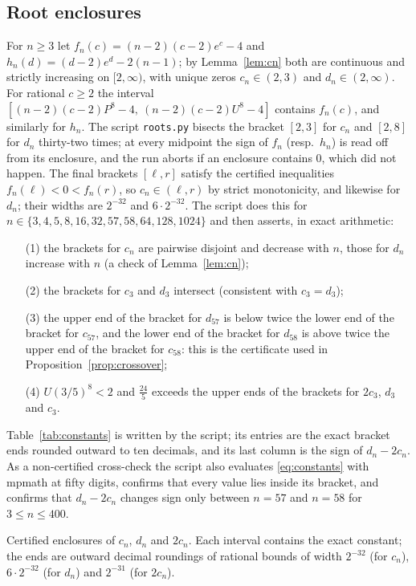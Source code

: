 \documentclass[11pt,a4paper]{article}
\theoremstyle{plain}
\theoremstyle{definition}
\begin{document}
\subsection{Root enclosures}
For $n\ge 3$ let $f_n(c)=(n-2)(c-2)e^{c}-4$ and $h_n(d)=(d-2)e^{d}-2(n-1)$; by Lemma~\ref{lem:cn} both are continuous and strictly increasing on $[2,\infty)$, with unique zeros $c_n\in(2,3)$ and $d_n\in(2,\infty)$. For rational $c\ge 2$ the interval $[(n-2)(c-2)P^8-4,\ (n-2)(c-2)U^8-4]$ contains $f_n(c)$, and similarly for $h_n$. The script \texttt{roots.py} bisects the bracket $[2,3]$ for $c_n$ and $[2,8]$ for $d_n$ thirty-two times; at every midpoint the sign of $f_n$ (resp.\ $h_n$) is read off from its enclosure, and the run aborts if an enclosure contains $0$, which did not happen. The final brackets $[\ell,r]$ satisfy the certified inequalities $f_n(\ell)<0<f_n(r)$, so $c_n\in(\ell,r)$ by strict monotonicity, and likewise for $d_n$; their widths are $2^{-32}$ and $6\cdot 2^{-32}$. The script does this for $n\in\{3,4,5,8,16,32,57,58,64,128,1024\}$ and then asserts, in exact arithmetic:
\begin{enumerate}
\item[(1)] the brackets for $c_n$ are pairwise disjoint and decrease with $n$, those for $d_n$ increase with $n$ (a check of Lemma~\ref{lem:cn});
\item[(2)] the brackets for $c_3$ and $d_3$ intersect (consistent with $c_3=d_3$);
\item[(3)] the upper end of the bracket for $d_{57}$ is below twice the lower end of the bracket for $c_{57}$, and the lower end of the bracket for $d_{58}$ is above twice the upper end of the bracket for $c_{58}$: this is the certificate used in Proposition~\ref{prop:crossover};
\item[(4)] $U(3/5)^{8}<2$ and $\tfrac{24}{5}$ exceeds the upper ends of the brackets for $2c_3$, $d_3$ and $c_3$.
\end{enumerate}
Table~\ref{tab:constants} is written by the script; its entries are the exact bracket ends rounded outward to ten decimals, and its last column is the sign of $d_n-2c_n$. As a non-certified cross-check the script also evaluates \eqref{eq:constants} with mpmath at fifty digits, confirms that every value lies inside its bracket, and confirms that $d_n-2c_n$ changes sign only between $n=57$ and $n=58$ for $3\le n\le 400$.

\begin{table}[t]
\centering\scriptsize\setlength{\tabcolsep}{4pt}

\caption{Certified enclosures of $c_n$, $d_n$ and $2c_n$. Each interval contains the exact constant; the ends are outward decimal roundings of rational bounds of width $2^{-32}$ (for $c_n$), $6\cdot 2^{-32}$ (for $d_n$) and $2^{-31}$ (for $2c_n$).}\label{tab:constants}
\end{table}
\end{document}

